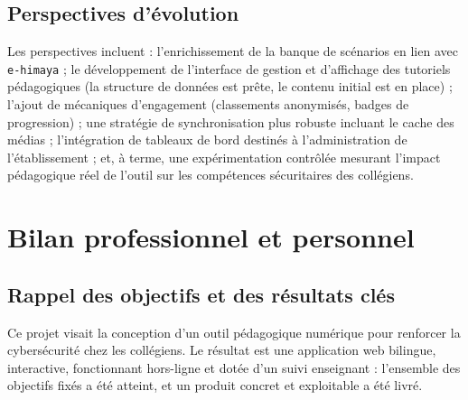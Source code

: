 \documentclass[12pt, a4paper, oneside]{report}
\begin{document}
\section{Perspectives d'évolution}
Les perspectives incluent : l'enrichissement de la banque de scénarios en lien avec \texttt{e-himaya} ; le développement de l'interface de gestion et d'affichage des tutoriels pédagogiques (la structure de données est prête, le contenu initial est en place) ; l'ajout de mécaniques d'engagement (classements anonymisés, badges de progression) ; une stratégie de synchronisation plus robuste incluant le cache des médias ; l'intégration de tableaux de bord destinés à l'administration de l'établissement ; et, à terme, une expérimentation contrôlée mesurant l'impact pédagogique réel de l'outil sur les compétences sécuritaires des collégiens.

\chapter*{Bilan professionnel et personnel}

\section*{Rappel des objectifs et des résultats clés}
Ce projet visait la conception d'un outil pédagogique numérique pour renforcer la cybersécurité chez les collégiens. Le résultat est une application web bilingue, interactive, fonctionnant hors-ligne et dotée d'un suivi enseignant : l'ensemble des objectifs fixés a été atteint, et un produit concret et exploitable a été livré.
\end{document}
